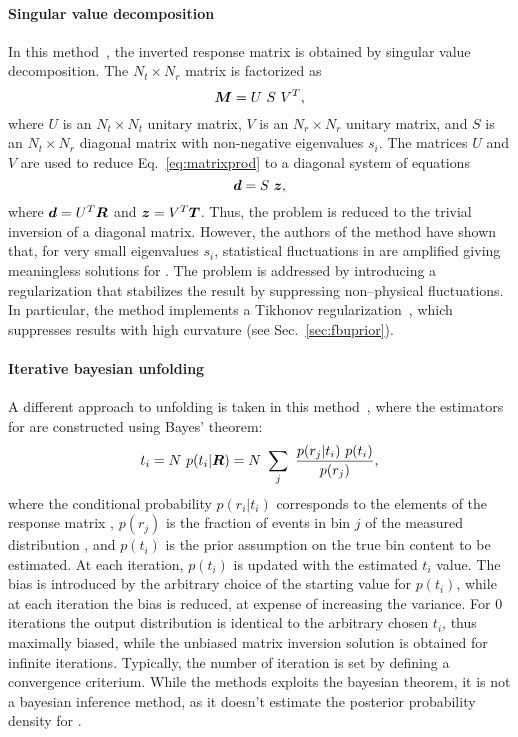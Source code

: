 \paragraph{Singular value decomposition}
In this method~\cite{Hocker:1995kb}, the inverted response matrix is
obtained by singular value decomposition. The $N_t\times N_r$ matrix
\TrasfMatrix{} is factorized as 
\begin{equation}
\boldsymbol{M}{} = U~S~V^T,
\end{equation}
where $U$ is an $N_t\times N_t$ unitary matrix, $V$ is an $N_r\times
N_r$ unitary matrix, and $S$ is an $N_t\times N_r$ diagonal matrix
with non-negative eigenvalues $s_i$.
The matrices $U$ and $V$ are used to reduce Eq.~\ref{eq:matrixprod}
to a diagonal system of equations
\begin{equation}
\boldsymbol{d} = S~\boldsymbol{z},
\end{equation}
where $\boldsymbol{d}=U^T\boldsymbol{R}{}$ and $\boldsymbol{z}=V^T\boldsymbol{T}{}$. Thus, the
problem is reduced to the trivial inversion of a diagonal matrix.
However, the authors of the method have shown that, for very small
eigenvalues $s_i$, statistical fluctuations in \Reco{} are amplified giving
meaningless solutions for \Truth{}. The problem is addressed by
introducing a regularization that stabilizes the result by suppressing
non--physical fluctuations. In particular, the method implements a
Tikhonov regularization~\cite{Tikhonov1943stability}, which suppresses
results with high curvature (see Sec.~\ref{sec:fbuprior}).
\paragraph{Iterative bayesian unfolding}
A different approach to unfolding is taken in this
method~\cite{dagostini1995NIMPA}, where the estimators for \Truth{}
are constructed using Bayes' theorem:
\begin{equation}
t_i = N~p(t_i|\boldsymbol{R}{}) = N~\sum_j~\frac{p(r_j|t_i)~p(t_i)}{p(r_j)},
\end{equation} 
where the conditional probability $p(r_i|t_i)$ corresponds to the
elements of the response matrix \TrasfMatrix{}, $p(r_j)$ is the
fraction of events in bin $j$ of the measured distribution \Reco{},
and $p(t_i)$ is the prior assumption on the true bin content to be
estimated. At each iteration, $p(t_i)$ is updated with the estimated
$t_i$ value. The bias is introduced by the arbitrary choice of the
starting value for $p(t_i)$, while at each iteration the bias is
reduced, at expense of increasing the variance. For 0
iterations the output distribution is identical to the arbitrary
chosen $t_i$, thus maximally biased, while the unbiased matrix
inversion solution is obtained for infinite iterations. Typically, the
number of iteration is set by defining a convergence criterium. While
the methods exploits the bayesian theorem, it is not a bayesian
inference method, as it doesn't estimate the posterior probability
density for \Truth{}.

